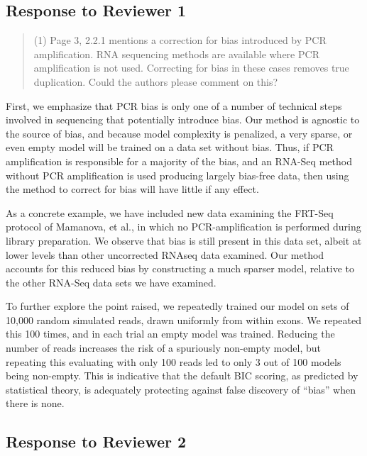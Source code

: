 \documentclass{article}
\begin{document}
\subsection*{Response to Reviewer 1}

\begin{quote}
(1) Page 3, 2.2.1 mentions a correction for bias introduced by PCR amplification.
RNA sequencing methods are available where PCR amplification is not used.
Correcting for bias in these cases removes true duplication.  Could the authors
please comment on this?
\end{quote}

First, we emphasize that PCR bias is only one of a number of technical steps
involved in sequencing that potentially introduce bias.  Our method is agnostic
to the source of bias, and because model complexity is penalized, a very sparse,
or even empty model will be trained on a data set without bias.  Thus, if PCR
amplification is responsible for a majority of the bias, and an RNA-Seq method
without PCR amplification is used producing largely bias-free data, then using
the method to correct for bias will have little if any effect.

As a concrete example, we have included new data examining the FRT-Seq protocol
of Mamanova, et al., in which no PCR-amplification is performed during library
preparation. We observe that bias is still present in this data set, albeit at
lower levels than other uncorrected RNAseq data examined.  Our method accounts
for this reduced bias by constructing a much sparser model, relative to the
other RNA-Seq data sets we have examined.

To further explore the point raised, we repeatedly trained our model on sets of
10,000 random simulated reads, drawn uniformly from within exons. We repeated
this 100 times, and in each trial an empty model was trained.  Reducing the
number of reads increases the risk of a spuriously non-empty model, but
repeating this evaluating with only 100 reads led to only 3 out of 100 models
being non-empty. This is indicative that the default BIC scoring, as predicted
by statistical theory, is adequately protecting against false discovery of
``bias'' when there is none.

\subsection*{Response to Reviewer 2}
\end{document}
